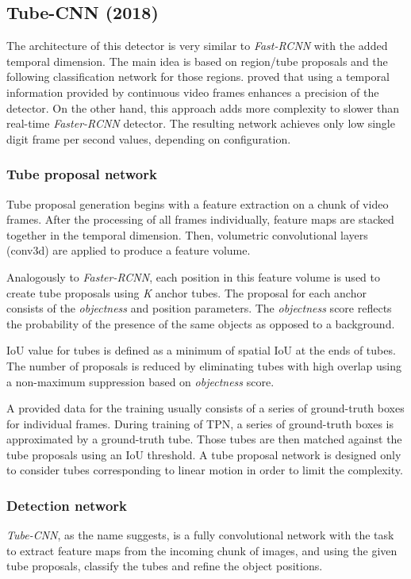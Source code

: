 \subsection{Tube-CNN (2018)}
The architecture of this detector is very similar to \textit{Fast-RCNN} with the added temporal dimension. The main idea is based on region/tube proposals and the following classification network for those regions. \citeauthor{bib:tubeCNN} \cite{bib:tubeCNN} proved that using a temporal information provided by continuous video frames enhances a precision of the detector. On the other hand, this approach adds more complexity to slower than real-time \textit{Faster-RCNN} detector. The resulting network achieves only low single digit frame per second values, depending on configuration. 

\subsubsection{Tube proposal network}
Tube proposal generation begins with a feature extraction on a chunk of video frames. After the processing of all frames individually, feature maps are stacked together in the temporal dimension. Then, volumetric convolutional layers (conv3d) are applied to produce a feature volume.

Analogously to \textit{Faster-RCNN}, each position in this feature volume is used to create tube proposals using \textit{K} anchor tubes. The proposal for each anchor consists of the \textit{objectness} and position parameters. The \textit{objectness} score reflects the probability of the presence of the same objects as opposed to a background. 

IoU value for tubes is defined as a minimum of spatial IoU at the ends of tubes. The number of proposals is reduced by eliminating tubes with high overlap using a non-maximum suppression based on \textit{objectness} score. 

A provided data for the training usually consists of a series of ground-truth boxes for individual frames. During training of TPN, a series of ground-truth boxes is approximated by a ground-truth tube. Those tubes are then matched against the tube proposals using an IoU threshold. A tube proposal network is designed only to consider tubes corresponding to linear motion in order to limit the complexity. 

\subsubsection{Detection network}
\textit{Tube-CNN}, as the name suggests, is a fully convolutional network with the task to extract feature maps from the incoming chunk of images, and using the given tube proposals, classify the tubes and refine the object positions. 

